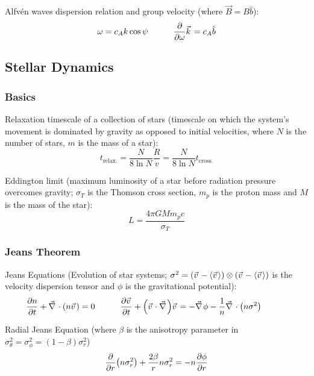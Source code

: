 			\noindent
			Alfvén waves dispersion relation and group velocity (where $\vec{B} = B \hat{b}$):
			\begin{equation}
				\omega = c_A k \cos \psi
				\hsp
				\pdv{\omega}\vec{k} = c_A \hat{b}
			\end{equation}

	\subsection{Stellar Dynamics}
		\subsubsection{Basics}
			Relaxation timescale of a collection of stars (timescale on which the system's movement is dominated by gravity as opposed to initial velocities, where $N$ is the number of stars, $m$ is the mass of a star):
			\begin{equation}
				t_{\text{relax.}} = \frac{N}{8\ln N} \frac{R}{v} = \frac{N}{8\ln N} t_{\text{cross.}}
			\end{equation}

			Eddington limit (maximum luminosity of a star before radiation pressure overcomes gravity; $\sigma_T$ is the Thomson cross section, $m_p$ is the proton mass and $M$ is the mass of the star):
			\begin{equation}
				L = \frac{4 \pi G M m_p c}{\sigma_T}
			\end{equation}


		\subsubsection{Jeans Theorem}
			Jeans Equations (Evolution of star systems; $\sigma^2 = \qty(\vec{v}-\avg{\vec{v}})\otimes\qty(\vec{v}-\avg{\vec{v}})$ is the velocity dispersion tensor and $\phi$ is the gravitational potential):
			\begin{equation}
				\pdv{n}{t} + \Nabla\cdot\qty(n\vec{v}) = 0 \hsp
				\pdv{\vec{v}}{t} + \qty(\vec{v}\cdot\Nabla)\vec{v} = -\Nabla\phi -\frac{1}{n}\Nabla\cdot\qty(n\sigma^2) \hsp
			\end{equation}

			\noindent
			Radial Jeans Equation (where $\beta$ is the anisotropy parameter in $\sigma_\theta^2 = \sigma_\phi^2 = (1-\beta) \sigma_r^2$)
			\begin{equation}
				\pdv{r} \qty(n\sigma_r^2) + \frac{2\beta}{r} n\sigma_r^2 = -n\pdv{\phi}{r}
			\end{equation}

